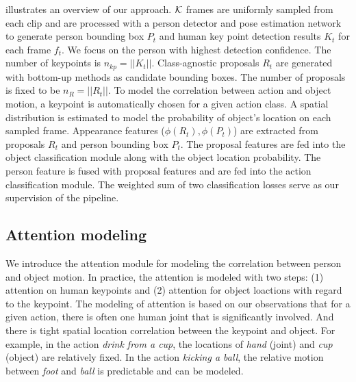  illustrates an overview of our approach. ${\mathcal K}$ frames are uniformly sampled from each clip and are processed with a person detector and pose estimation network to generate person bounding box $P_t$ and human key point detection results $K_t$ for each frame $f_t$. We focus on the person with highest detection confidence. The number of keypoints is $n_{kp}=||K_t||$. Class-agnostic proposals $R_t$ are generated with bottom-up methods as candidate bounding boxes. The number of proposals is fixed to be $n_R=||R_t||$. To model the correlation between action and object motion, a keypoint is automatically chosen for a given action class. A spatial distribution is estimated to model the probability of object's location on each sampled frame. Appearance features ($\phi(R_t), \phi(P_t)$) are extracted from proposals $R_t$ and person bounding box $P_t$. The proposal features are fed into the object classification module along with the object location probability. The person feature is fused with proposal features and are fed into the action classification module. The weighted sum of two classification losses serve as our supervision of the pipeline.


\subsection{Attention modeling}
We introduce the attention module for modeling the correlation between person and object motion. In practice, the attention is modeled with two steps: (1) attention on human keypoints and (2) attention for object loactions with regard to the keypoint. The modeling of attention is based on our observations that for a given action, there is often one human joint that is significantly involved. And there is tight spatial location correlation between the keypoint and object. For example, in the action \textit{drink from a cup}, the locations of \textit{hand} (joint) and \textit{cup} (object) are relatively fixed. In the action \textit{kicking a ball}, the relative motion between \textit{foot} and \textit{ball} is predictable and can be modeled.


